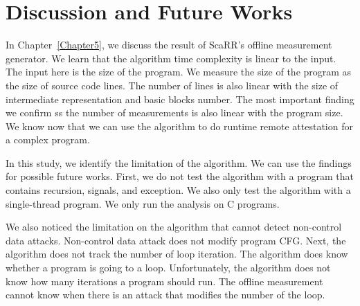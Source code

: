 
\chapter{Discussion and Future Works} %

\label{Chapter6} %

In Chapter~\ref{Chapter5}, we discuss the result of ScaRR's offline measurement
generator. We learn that the algorithm time complexity is linear to the input.
The input here is the size of the program. We measure the size of the program as
the size of source code lines. The number of lines is also linear with the size
of intermediate representation and basic blocks number. The most important
finding we confirm ss the number of measurements is also linear with the program
size. We know now that we can use the algorithm to do runtime remote attestation
for a complex program.

In this study, we identify the limitation of the algorithm. We can use the
findings for possible future works. First, we do not test the algorithm with a
program that contains recursion, signals, and exception. We also only test the
algorithm with a single-thread program. We only run the analysis on C programs.

We also noticed the limitation on the algorithm that cannot detect non-control
data attacks. Non-control data attack does not modify program CFG. Next, the
algorithm does not track the number of loop iteration. The algorithm does know
whether a program is going to a loop. Unfortunately, the algorithm does not know
how many iterations a program should run. The offline measurement cannot know
when there is an attack that modifies the number of the loop. 